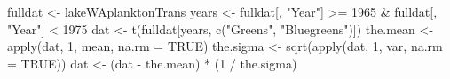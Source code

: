 \begin{Schunk}
\begin{Sinput}
 fulldat <- lakeWAplanktonTrans
 years <- fulldat[, "Year"] >= 1965 & fulldat[, "Year"] < 1975
 dat <- t(fulldat[years, c("Greens", "Bluegreens")])
 the.mean <- apply(dat, 1, mean, na.rm = TRUE)
 the.sigma <- sqrt(apply(dat, 1, var, na.rm = TRUE))
 dat <- (dat - the.mean) * (1 / the.sigma)
\end{Sinput}
\end{Schunk}
